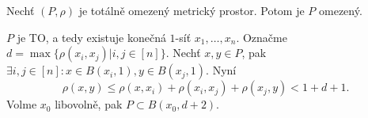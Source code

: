 \documentclass[12pt]{article}					%
\begin{document}
		\begin{veta}
			Nechť $(P, \rho)$ je totálně omezený metrický prostor. Potom je $P$ omezený.

			\begin{dukazin}
				$P$ je TO, a tedy existuje konečná $1$-síť $x_1, …, x_n$. Označme $d = \max\{\rho(x_i, x_j) | i, j \in [n]\}$. Nechť $x, y \in P$, pak $\exists i, j \in [n]: x \in B(x_i, 1), y \in B(x_j, 1)$. Nyní
				$$ \rho(x, y) ≤ \rho(x, x_i) + \rho(x_i, x_j) + \rho(x_j, y) < 1 + d + 1. $$
				Volme $x_0$ libovolně, pak $P \subset B(x_0, d + 2)$.
			\end{dukazin}
		\end{veta}
\end{document}
